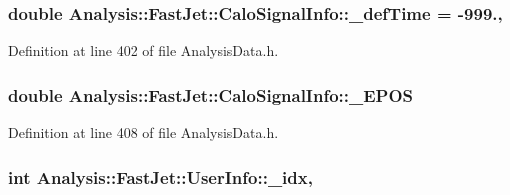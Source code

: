 \subsubsection[{\texorpdfstring{\+\_\+def\+Time}{_defTime}}]{\setlength{\rightskip}{0pt plus 5cm}double Analysis\+::\+Fast\+Jet\+::\+Calo\+Signal\+Info\+::\+\_\+def\+Time = -\/999.\hspace{0.3cm}{\ttfamily [static]}, {\ttfamily [protected]}}\hypertarget{classAnalysis_1_1FastJet_1_1CaloSignalInfo_acd4a5a250d92298dd91d4081be322f72}{}\label{classAnalysis_1_1FastJet_1_1CaloSignalInfo_acd4a5a250d92298dd91d4081be322f72}


Definition at line 402 of file Analysis\+Data.\+h.

\subsubsection[{\texorpdfstring{\+\_\+\+E\+P\+OS}{_EPOS}}]{\setlength{\rightskip}{0pt plus 5cm}double Analysis\+::\+Fast\+Jet\+::\+Calo\+Signal\+Info\+::\+\_\+\+E\+P\+OS\hspace{0.3cm}{\ttfamily [protected]}}\hypertarget{classAnalysis_1_1FastJet_1_1CaloSignalInfo_a332e388462beecce5426c3c3dfd43240}{}\label{classAnalysis_1_1FastJet_1_1CaloSignalInfo_a332e388462beecce5426c3c3dfd43240}


Definition at line 408 of file Analysis\+Data.\+h.

\subsubsection[{\texorpdfstring{\+\_\+idx}{_idx}}]{\setlength{\rightskip}{0pt plus 5cm}int Analysis\+::\+Fast\+Jet\+::\+User\+Info\+::\+\_\+idx\hspace{0.3cm}{\ttfamily [protected]}, {\ttfamily [inherited]}}\hypertarget{classAnalysis_1_1FastJet_1_1UserInfo_ad9aa33e317aea2b675493b664cc718a3}{}\label{classAnalysis_1_1FastJet_1_1UserInfo_ad9aa33e317aea2b675493b664cc718a3}


